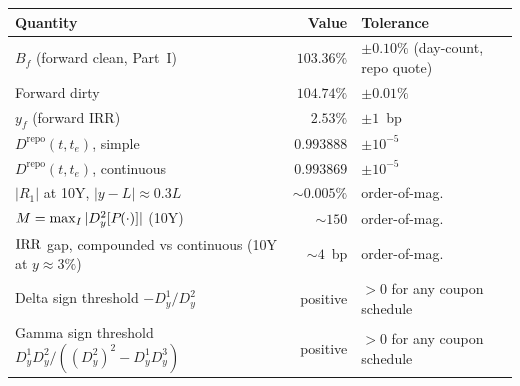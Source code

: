 \documentclass[11pt,a4paper]{article}
\newcommand{\Drepo}{D^{\mathrm{repo}}}
\newcommand{\Bf}{B_f}
\newcommand{\dD}[1]{D_{y}^{#1}}
\begin{document}
\begin{validation}
\smallskip
\begin{tabular}{@{}p{7cm}rl@{}}
\toprule
Quantity                                        & Value          & Tolerance \\
\midrule
$\Bf$ (forward clean, Part~I)                   & $103.36\%$     & $\pm 0.10\%$ (day-count, repo quote) \\
Forward dirty                                   & $104.74\%$     & $\pm 0.01\%$ \\
$y_f$ (forward IRR)                             & $2.53\%$       & $\pm 1$~bp \\
$\Drepo(t, t_e)$, simple                        & $0.993888$     & $\pm 10^{-5}$ \\
$\Drepo(t, t_e)$, continuous                    & $0.993869$     & $\pm 10^{-5}$ \\
$|R_1|$ at 10Y, $|y-L| \approx 0.3 L$           & $\sim 0.005\%$ & order-of-mag. \\
$M = \max_I |\dD{2}[\Bond{}{\cdot}]|$ (10Y)     & $\sim 150$     & order-of-mag. \\
$\mathrm{IRR}$ gap, compounded vs continuous (10Y at $y\approx 3\%$) & $\sim 4$~bp & order-of-mag. \\
Delta sign threshold $-\dD{1}/\dD{2}$           & positive       & $> 0$ for any coupon schedule \\
Gamma sign threshold $\dD{1}\dD{2}/((\dD{2})^2 - \dD{1}\dD{3})$ & positive & $> 0$ for any coupon schedule \\
\bottomrule
\end{tabular}
\smallskip


\end{validation}
\end{document}

